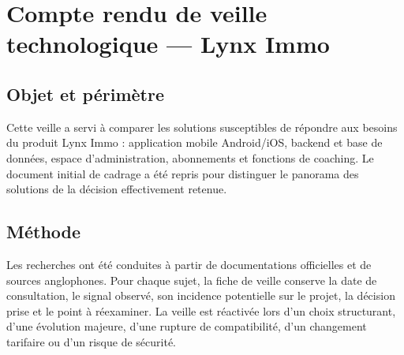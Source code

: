 \chapter{Compte rendu de veille technologique --- Lynx Immo}
\label{ann:ipf-veille-technologique}

\section*{Objet et périmètre}

Cette veille a servi à comparer les solutions susceptibles de répondre aux besoins du produit Lynx Immo : application mobile Android/iOS, backend et base de données, espace d'administration, abonnements et fonctions de coaching. Le document initial de cadrage a été repris pour distinguer le panorama des solutions de la décision effectivement retenue.

\section*{Méthode}

Les recherches ont été conduites à partir de documentations officielles et de sources anglophones. Pour chaque sujet, la fiche de veille conserve la date de consultation, le signal observé, son incidence potentielle sur le projet, la décision prise et le point à réexaminer. La veille est réactivée lors d'un choix structurant, d'une évolution majeure, d'une rupture de compatibilité, d'un changement tarifaire ou d'un risque de sécurité.

